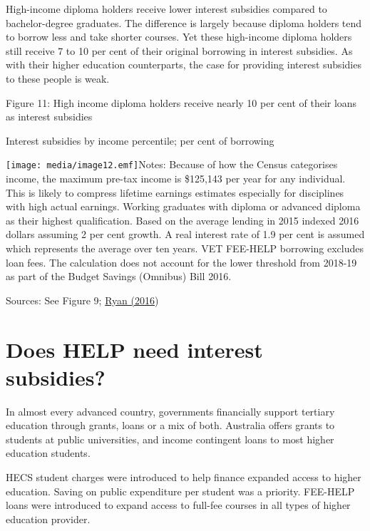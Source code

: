 \documentclass[]{book}
\begin{document}
High-income diploma holders receive lower interest subsidies compared to bachelor-degree graduates. The difference is largely because diploma holders tend to borrow less and take shorter courses. Yet these high-income diploma holders still receive 7 to 10 per cent of their original borrowing in interest subsidies. As with their higher education counterparts, the case for providing interest subsidies to these people is weak.

\protect\hypertarget{_Ref324612838}{}{\protect\hypertarget{_Ref324612834}{}{}}Figure 11: High income diploma holders receive nearly 10 per cent of their loans as interest subsidies

Interest subsidies by income percentile; per cent of borrowing

\texttt{[image: media/image12.emf]}Notes: Because of how the Census categorises income, the maximum pre-tax income is \$125,143 per year for any individual. This is likely to compress lifetime earnings estimates especially for disciplines with high actual earnings. Working graduates with diploma or advanced diploma as their highest qualification. Based on the average lending in 2015 indexed 2016 dollars assuming 2 per cent growth. A real interest rate of 1.9 per cent is assumed which represents the average over ten years. VET FEE-HELP borrowing excludes loan fees. The calculation does not account for the lower threshold from 2018-19 as part of the Budget Savings (Omnibus) Bill 2016.

Sources: See Figure 9; \protect\hyperlink{_ENREF_71}{Ryan (2016})

\chapter{\texorpdfstring{\protect\hypertarget{_Ref463448789}{}{\protect\hypertarget{_Toc341784483}{}{}}Does HELP need interest subsidies? }{Does HELP need interest subsidies? }}\label{does-help-need-interest-subsidies}

In almost every advanced country, governments financially support tertiary education through grants, loans or a mix of both. Australia offers grants to students at public universities, and income contingent loans to most higher education students.

HECS student charges were introduced to help finance expanded access to higher education. Saving on public expenditure per student was a priority. FEE-HELP loans were introduced to expand access to full-fee courses in all types of higher education provider.
\end{document}
